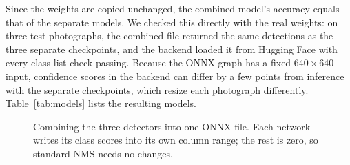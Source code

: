 \documentclass[journal]{IEEEtran}
\begin{document}
Since the weights are copied unchanged, the combined model's
accuracy equals that of the separate models. We checked this
directly with the real weights: on three test photographs, the
combined file returned the same detections as the three separate
checkpoints, and the backend loaded it from Hugging Face with every
class-list check passing. Because the ONNX graph has a fixed
$640\times640$ input, confidence scores in the backend can differ by a
few points from inference with the separate checkpoints, which resize
each photograph differently.
Table~\ref{tab:models} lists the resulting models.

\begin{figure}[!tb]
\centering
\setlength{\fboxsep}{4pt}
\caption{Combining the three detectors into one ONNX file. Each
network writes its class scores into its own column range; the rest
is zero, so standard NMS needs no changes.}
\label{fig:combined}
\end{figure}
\end{document}
